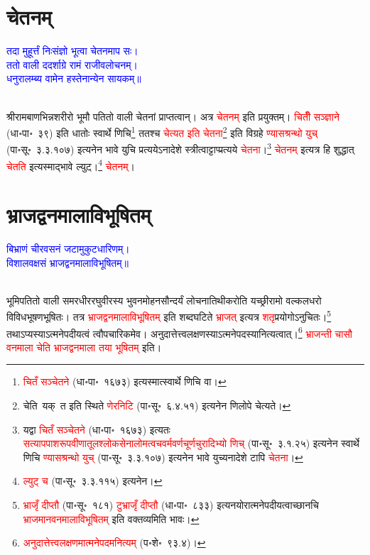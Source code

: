 \section[चेतनम्]{चेतनम्}
\centering\textcolor{blue}{तदा मुहूर्त्तं निःसंज्ञो भूत्वा चेतनमाप सः।\nopagebreak\\
ततो वाली ददर्शाग्रे रामं राजीवलोचनम्।\nopagebreak\\
धनुरालम्ब्य वामेन हस्तेनान्येन सायकम्॥}\nopagebreak\\
\\
\begin{sloppypar}\justifying\noindent\hspace{10mm} श्रीराम\-बाण\-भिन्न\-शरीरो भूमौ पतितो वाली चेतनां प्राप्तत्वान्। अत्र \textcolor{red}{चेतनम्} इति प्रयुक्तम्। \textcolor{red}{चितीँ सञ्ज्ञाने} (धा॰पा॰~३९) इति धातोः स्वार्थे णिचि\footnote{\textcolor{red}{चितँ सञ्चेतने} (धा॰पा॰~१६७३) इत्यस्मात्स्वार्थे णिचि वा।} ततश्च \textcolor{red}{चेत्यत इति चेतना}\footnote{चेति~यक्~त इति स्थिते \textcolor{red}{णेरनिटि} (पा॰सू॰~६.४.५१) इत्यनेन णिलोपे चेत्यते।} इति विग्रहे \textcolor{red}{ण्यास\-श्रन्थो युच्} (पा॰सू॰~३.३.१०७) इत्यनेन भावे युचि प्रत्ययेऽनादेशे स्त्रीत्वाट्टाप्प्रत्यये \textcolor{red}{चेतना}।\footnote{यद्वा \textcolor{red}{चितँ सञ्चेतने} (धा॰पा॰~१६७३) इत्यतः \textcolor{red}{सत्याप\-पाश\-रूप\-वीणा\-तूल\-श्लोक\-सेना\-लोम\-त्वच\-वर्म\-वर्ण\-चूर्ण\-चुरादिभ्यो णिच्} (पा॰सू॰~३.१.२५) इत्यनेन स्वार्थे णिचि \textcolor{red}{ण्यास\-श्रन्थो युच्} (पा॰सू॰~३.३.१०७) इत्यनेन भावे युच्यनादेशे टापि \textcolor{red}{चेतना}।} \textcolor{red}{चेतनम्} इत्यत्र हि शुद्धात् \textcolor{red}{चेतति} इत्यस्माद्भावे ल्युट्।\footnote{\textcolor{red}{ल्युट् च} (पा॰सू॰~३.३.११५) इत्यनेन।} \textcolor{red}{चेतनम्}। \end{sloppypar}
\section[भ्राजद्वनमालाविभूषितम्]{भ्राजद्वनमालाविभूषितम्}
\centering\textcolor{blue}{बिभ्राणं चीरवसनं जटामुकुटधारिणम्।\nopagebreak\\
विशालवक्षसं भ्राजद्वनमालाविभूषितम्॥}\nopagebreak\\
\\
\begin{sloppypar}\justifying\noindent\hspace{10mm} भूमिपतितो वाली समर\-धीर\-रघु\-वीरस्य भुवन\-मोहन\-सौन्दर्यं लोचनातिथी\-करोति यच्छ्रीरामो वल्कल\-धरो विविध\-भूषण\-भूषितः। तत्र \textcolor{red}{भ्राजद्वनमाला\-विभूषितम्} इति शब्द\-घटिते \textcolor{red}{भ्राजत्} इत्यत्र \textcolor{red}{शतृ}\-प्रयोगोऽनुचितः।\footnote{\textcolor{red}{भ्राजृँ दीप्तौ} (पा॰सू॰~१८१) \textcolor{red}{टुभ्राजृँ दीप्तौ} (धा॰पा॰~८३३) इत्यनयोरात्मने\-पदीयत्वाच्छानचि \textcolor{red}{भ्राजमान\-वनमाला\-विभूषितम्} इति वक्तव्यमिति भावः।} तथाऽप्यस्याऽत्मने\-पदीयत्वं त्वौप\-चारिकमेव। अनुदात्तेत्त्व\-लक्षणस्याऽत्मने\-पदस्यानित्यत्वात्।\footnote{\textcolor{red}{अनुदात्तेत्त्व\-लक्षणमात्मने\-पदमनित्यम्} (प॰शे॰~९३.४)।} \textcolor{red}{भ्राजन्ती चासौ वनमाला चेति भ्राजद्वनमाला तया भूषितम्} इति।\end{sloppypar}
